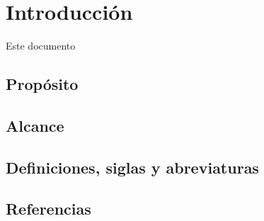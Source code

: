 \chapter{Introducción}
 Este documento
\section{Propósito}

\section{Alcance}

\section{Definiciones, siglas y abreviaturas}

\section{Referencias}